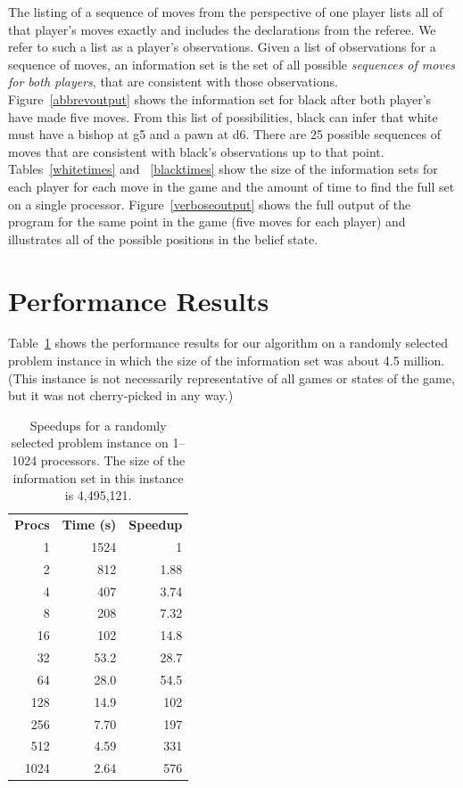 \documentclass[11pt]{article}
\begin{document}
The listing of a sequence of moves from the perspective of one player lists all of that player's moves exactly and
includes the declarations from the referee.  We refer to such a list as a player's observations.  Given a list of
observations for a sequence of moves, an information set is the set of all possible {\em sequences of moves for both
players}, that are consistent with those observations.  Figure~\ref{abbrevoutput} shows the information set for black
after both player's have made five moves.  From this list of possibilities, black can infer that white must have a
bishop at g5 and a pawn at d6.  There are 25 possible sequences of moves that are consistent with black's observations
up to that point. Tables~\ref{whitetimes} and ~\ref{blacktimes} show the size of the information sets for each player
for each move in the game and the amount of time to find the full set on a single processor.  Figure~\ref{verboseoutput}
shows the full output of the program for the same point in the game (five moves for each player) and illustrates all of
the possible positions in the belief state.
   

\section{Performance Results}


Table~\ref{speedups} shows the performance results for our algorithm on a randomly selected problem instance in which
the size of the information set was about 4.5 million.  (This instance is not necessarily representative of all games or
states of the game, but it was not cherry-picked in any way.)

\begin{table}
\centering
\begin{tabular}{rrr}
{\bf Procs}	&	{\bf Time (s)} 	&	{\bf Speedup}\\
1	&	1524	&	1\\
2	&	812	&	1.88\\
4	&	407	&	3.74\\
8	&	208	&	7.32\\
16	&	102	&	14.8\\
32	&	53.2	&	28.7\\
64	&	28.0	&	54.5\\
128	&	14.9	&	102\\
256	&	7.70	&	197\\
512	&	4.59	&	331\\
1024	&	2.64	&	576\\
\end{tabular}
\caption{Speedups for a randomly selected problem instance on 1--1024 processors.  The size of the information set in
this instance is 4,495,121.}
\label{speedups}
\end{table}
\end{document}
